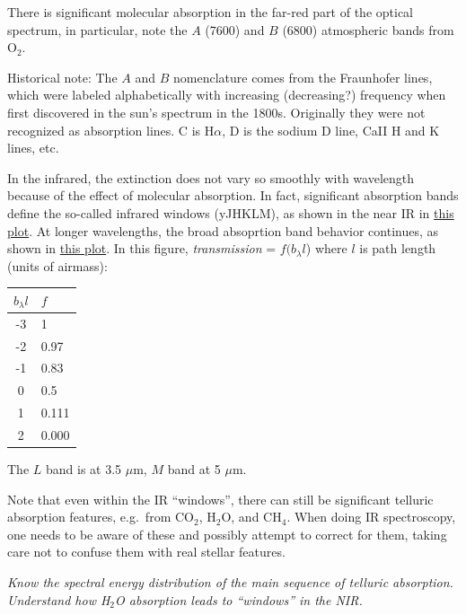\documentclass[12pt]{article}
\newcommand{\mynotes}[1]{\textcolor{myBlue}{#1}}
\newcommand{\test}[1]{%
    \begin{center}
        {\parbox{0.9\textwidth}{\textit{\small#1}}}
    \end{center}}
\begin{document}
There is significant molecular absorption in the far-red part of the
optical spectrum, in particular, note the $A$ (7600) and $B$ (6800) atmospheric
bands from O$_{2}$.

\mynotes{Historical note: The $A$ and $B$ nomenclature comes from
the Fraunhofer lines, which were labeled alphabetically with increasing
(decreasing?) frequency when first discovered in the sun's spectrum in the
1800s. Originally they were not recognized as absorption lines. C is H$\alpha$,
D is the sodium D line, CaII H and K lines, etc.}

In the infrared, the extinction does not vary so smoothly with wavelength
because of the effect of molecular absorption. In fact, significant absorption
bands define the so-called infrared windows (yJHKLM), as shown in the near IR in \href{http://astronomy.nmsu.edu/holtz/a535/html/diagrams/a535/mandbell.htm}
{this plot}. At longer wavelengths, the broad absoprtion band behavior
continues, as shown in \href{http://astronomy.nmsu.edu/holtz/a535/html/diagrams/a535/allen1.htm}
{this plot}. In this figure, \emph{transmission} = $f(b_{\lambda}l$) where $l$
is path length (units of airmass):

\begin{center}
    \begin{tabular}{c l}
        $b_{\lambda}l$ & $f$\\
        \hline\hline
        -3  & 1\\
        -2  & 0.97\\
        -1  & 0.83\\
        0   & 0.5\\
        1   & 0.111\\
        2   & 0.000\\
        \hline
    \end{tabular}
\end{center}

The $L$ band is at 3.5 $\mu$m, $M$ band at 5 $\mu$m.

Note that even within the IR ``windows'', there can still be significant
telluric absorption features, e.g.\ from CO$_{2}$, H$_{2}$O, and CH$_{4}$. When
doing IR spectroscopy, one needs to be aware of these and possibly attempt to
correct for them, taking care not to confuse them with real stellar features.

\test{Know the spectral energy distribution of the main sequence of telluric
absorption. Understand how H$_{2}$O absorption leads to ``windows'' in the
NIR.}
\end{document}
